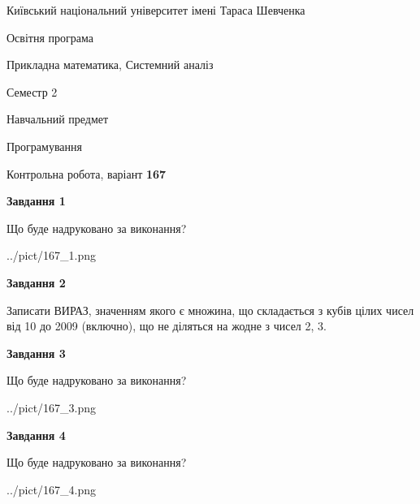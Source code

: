 \documentclass[12pt, ukrainian]{article}
\begin{document}
{{\begin {small}\par
{ \center  Київський національний університет імені Тараса Шевченка \par}
{\parbox {5 cm}{Освітня програма \hfill}{\parbox {8 cm}{Прикладна математика, Системний аналіз \hfill}}\parbox {5 cm}{\hfill Семестр 2}}\par
{\parbox {5 cm} {Навчальний предмет \hfill}\parbox {7 cm}{Програмування \hfill}\parbox {6cm}{\hfill}\par}\vspace{-7pt} \end{small}}{\center Контрольна робота, варіант  \No \textbf
{ 167 }\par}}
{
\begin {large}
{\begin {center}\textbf{Завдання 1}\end {center}}\par
Що буде надруковано за виконання?\par\par
\begin{center}
	{../pict/167_1.png}
\end{center}
\newpage

{\begin {center}\textbf{Завдання 2}\end {center}}\par
Записати ВИРАЗ, значенням якого є множина, що складається з кубів цілих чисел від 10 до 2009 (включно), що не діляться на жодне з чисел 2, 3.\par
\newpage

{\begin {center}\textbf{Завдання 3}\end {center}}\par
Що буде надруковано за виконання?
\begin{center}
	{../pict/167_3.png}
\end{center}
\newpage

{\begin {center}\textbf{Завдання 4}\end {center}}\par
Що буде надруковано за виконання?\par
\begin{center}
	{../pict/167_4.png}
\end{center}
\newpage


\end{large}}
\end{document}
